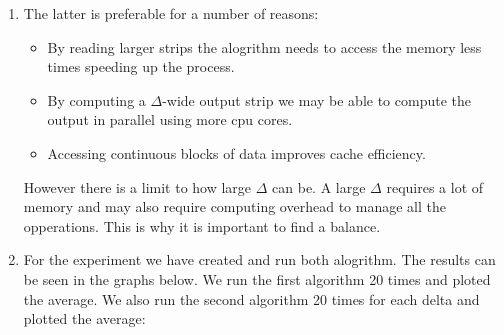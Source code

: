 \documentclass{article}
\begin{document}
\noindent 
\begin{enumerate} [label = \Alph*]
  \item The latter is preferable for a number of reasons:
  \begin{itemize}
    \item By reading larger strips the alogrithm needs to access the memory less times speeding up the process.
    \item By computing a $\Delta$-wide output strip we may be able to compute the output in parallel using more cpu cores.
    \item Accessing continuous blocks of data improves cache efficiency.
  \end{itemize}
  However there is a limit to how large $\Delta$ can be. A large $\Delta$ requires a lot of memory and may also require computing overhead to manage all the opperations.
  This is why it is important to find a balance.

  \item For the experiment we have created and run both alogrithm. The results can be seen in the graphs below.
  We run the first algorithm 20 times and ploted the average. We also run the second algorithm 20 times for each delta and plotted the average:


\end{enumerate}
\end{document}
